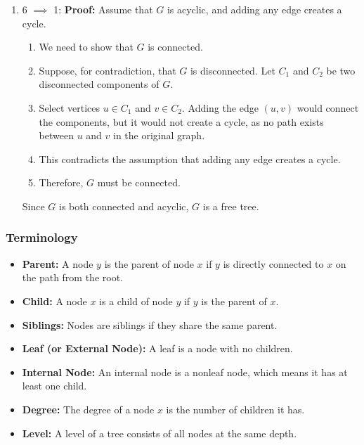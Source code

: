 \begin{derivation}
\begin{enumerate}
            \item 6 $\implies$ 1:
            \textbf{Proof:} Assume that \( G \) is acyclic, and adding any edge creates a cycle.
            \begin{enumerate}
                \item We need to show that \( G \) is connected.
                \item Suppose, for contradiction, that \( G \) is disconnected. Let \( C_1 \) and \( C_2 \) be two disconnected components of \( G \).
                \item Select vertices \( u \in C_1 \) and \( v \in C_2 \). Adding the edge \( (u, v) \) would connect the components, but it would not create a cycle, as no path exists between \( u \) and \( v \) in the original graph.
                \item This contradicts the assumption that adding any edge creates a cycle.
                \item Therefore, \( G \) must be connected.
            \end{enumerate}
            Since \( G \) is both connected and acyclic, \( G \) is a free tree.
        \end{enumerate}
    \end{derivation}

    \subsubsection{Terminology}
    \begin{terminology}
        \begin{itemize}            
            \item \textbf{Parent:} A node \( y \) is the parent of node \( x \) if \( y \) is directly connected to \( x \) on the path from the root.
            
            \item \textbf{Child:} A node \( x \) is a child of node \( y \) if \( y \) is the parent of \( x \).
            
            \item \textbf{Siblings:} Nodes are siblings if they share the same parent.
            
            \item \textbf{Leaf (or External Node):} A leaf is a node with no children.
            
            \item \textbf{Internal Node:} An internal node is a nonleaf node, which means it has at least one child.
            
            \item \textbf{Degree:} The degree of a node \( x \) is the number of children it has.
            
            \item \textbf{Level:} A level of a tree consists of all nodes at the same depth.
            
        \end{itemize}
    \end{terminology}

